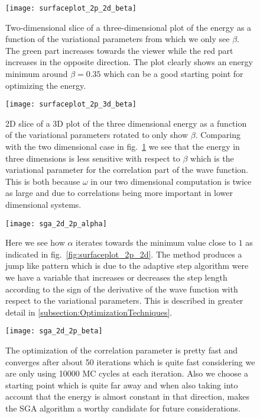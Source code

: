 \clearpage

\begin{figure}[!p]
  \begin{center}
    \texttt{[image: surfaceplot\_2p\_2d\_beta]}
  \end{center}
  \caption{Two-dimensional slice of a three-dimensional plot of the energy as a function of the variational parameters from which we only see $\beta$. The green part increases towards the viewer while the red part increases in the opposite direction. The plot clearly shows an energy minimum around $\beta=0.35$ which can be a good starting point for optimizing the energy.}
\label{fig:surfaceplot_2p_2d_beta}
\end{figure}

\begin{figure}[!p]
  \begin{center}
    \texttt{[image: surfaceplot\_2p\_3d\_beta]}
  \end{center}
  \caption{2D slice of a 3D plot of the three dimensional energy as a function of the variational parameters rotated to only show $\beta$. Comparing with the two dimensional case in fig.~\ref{fig:surfaceplot_2p_2d_beta} we see that the energy in three dimensions is less sensitive with respect to $\beta$ which is the variational parameter for the correlation part of the wave function. This is both because $\omega$ in our two dimensional computation is twice as large and due to correlations being more important in lower dimensional systems.}
  \label{fig:surfaceplot_2p_3d_beta}
\end{figure}

\clearpage

\begin{figure}[!p]
  \begin{center}
    \texttt{[image: sga\_2d\_2p\_alpha]}
  \end{center}
  \caption{Here we see how $\alpha$ iterates towards the minimum value close to $1$ as indicated in fig.~\ref{fig:surfaceplot_2p_2d}. The method produces a jump like pattern which is due to the adaptive step algorithm were we have a variable that increases or decreases the step length according to the sign of the derivative of the wave function with respect to the variational parameters. This is described in greater detail in \ref{subsection:OptimizationTechniques}. }
  \label{fig:sga_2d_2p_alpha}
\end{figure}

\begin{figure}[!p]
  \begin{center}
    \texttt{[image: sga\_2d\_2p\_beta]}
  \end{center}
  \caption{The optimization of the correlation parameter is pretty fast and converges after about 50 iterations which is quite fast considering we are only using 10000 MC cycles at each iteration. Also we choose a starting point which is quite far away and when also taking into account that the energy is almost constant in that direction, makes the SGA algorithm a worthy candidate for future considerations.}
  \label{fig:sga_2d_2p_beta}
\end{figure}

